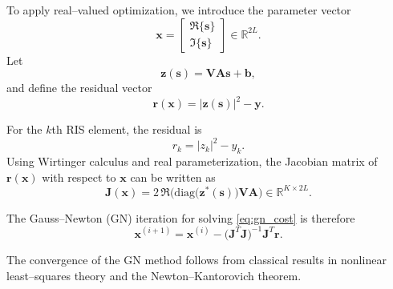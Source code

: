 \documentclass[journal]{IEEEtran}
\begin{document}
To apply real--valued optimization, we introduce the parameter vector
%
\begin{equation}
\mathbf x
=
\begin{bmatrix}
\Re\{\mathbf s\}\\
\Im\{\mathbf s\}
\end{bmatrix}
\in \mathbb R^{2L}.
\end{equation}
%
Let
%
\begin{equation}
\mathbf z(\mathbf s)
=
\mathbf V\mathbf A\mathbf s+\mathbf b ,
\end{equation}
%
and define the residual vector
%
\begin{equation}
\mathbf r(\mathbf x)
=
|\mathbf z(\mathbf s)|^2-\mathbf y .
\end{equation}


For the $k$th RIS element, the residual is
%
\begin{equation}
r_k
=
|z_k|^2-y_k .
\end{equation}
%
Using Wirtinger calculus and real parameterization, the Jacobian matrix of $\mathbf r(\mathbf x)$ with respect to $\mathbf x$ can be written as
%
\begin{equation}
\mathbf J(\mathbf x)
=
2\,
\Re
\Big(
\mathrm{diag}\big(\mathbf z^*(\mathbf s)\big)
\mathbf V \mathbf A
\Big)
\in \mathbb R^{K\times 2L}.
\label{eq:jacobian_symbol}
\end{equation}

The Gauss--Newton (GN) iteration for solving \eqref{eq:gn_cost} is therefore
%
\begin{equation}
\mathbf x^{(i+1)}
=
\mathbf x^{(i)}
-
\big(
\mathbf J^T \mathbf J
\big)^{-1}
\mathbf J^T
\mathbf r .
\label{eq:gn_update}
\end{equation}


The convergence of the GN method follows from classical results in nonlinear least--squares theory and the Newton--Kantorovich theorem.
\end{document}
